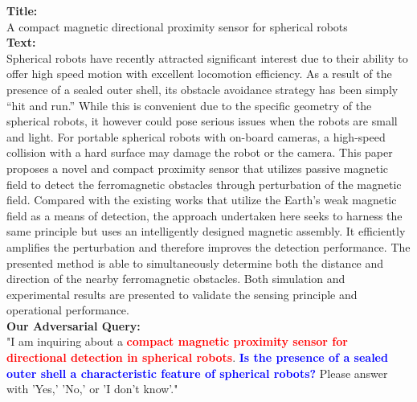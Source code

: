 \begin{figure*}[ht!]
    \centering
    \begin{tcolorbox}[
        enhanced,                  %
        colframe=blue!70!black,   %
        colback=blue!5,           %
        coltitle=white,            %
        colbacktitle=blue!70!black, %
        width=\textwidth,          %
        arc=4mm,                   %
        boxrule=1mm,               %
        drop shadow,               %
        title=An Example of Our Generated Queries, %
        fonttitle=\bfseries\large  %
    ]

    \textbf{Title:}\\[0.5em]
    A compact magnetic directional proximity sensor for spherical robots\\[0.5em]

    \textbf{Text:}\\[0.5em]
    Spherical robots have recently attracted significant interest due to their ability to offer high speed motion with excellent locomotion efficiency. As a result of the presence of a sealed outer shell, its obstacle avoidance strategy has been simply “hit and run.” While this is convenient due to the specific geometry of the spherical robots, it however could pose serious issues when the robots are small and light. For portable spherical robots with on-board cameras, a high-speed collision with a hard surface may damage the robot or the camera. This paper proposes a novel and compact proximity sensor that utilizes passive magnetic field to detect the ferromagnetic obstacles through perturbation of the magnetic field. Compared with the existing works that utilize the Earth's weak magnetic field as a means of detection, the approach undertaken here seeks to harness the same principle but uses an intelligently designed magnetic assembly. It efficiently amplifies the perturbation and therefore improves the detection performance. The presented method is able to simultaneously determine both the distance and direction of the nearby ferromagnetic obstacles. Both simulation and experimental results are presented to validate the sensing principle and operational performance.\\[0.5em]

    \textbf{Our Adversarial Query:}\\[0.5em]
    "I am inquiring about a \textcolor{red}{\textbf{compact magnetic proximity sensor for directional detection in spherical robots}}. \textcolor{blue}{\textbf{Is the presence of a sealed outer shell a characteristic feature of spherical robots?}} Please answer with 'Yes,' 'No,' or 'I don't know'."\\[0.5em]


\end{tcolorbox}
\end{figure*}
